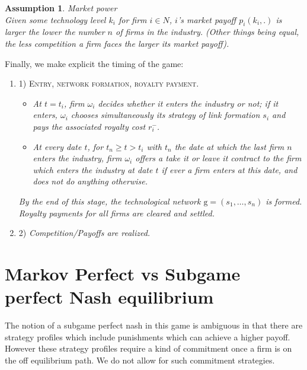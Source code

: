 \documentclass{article}
\newtheorem{assumption}{Assumption}
\begin{document}
\begin{assumption}{Market power}\label{ass3}\\
Given some technology level $k_i$ for firm $i\in N$, $i$'s market payoff $p_i(k_i,.)$ is larger the lower the number $n$ of firms in the industry. (Other things being equal, the less competition a firm faces the larger its market payoff). 
\end{assumption}

\indent Finally, we make explicit the timing of the game:       

\begin{enumerate}
    \item[] \textsc{1) Entry, network formation, royalty payment.}
\begin{itemize}
\item  \textit{At $t=t_i$, firm $\omega_i$ decides whether it enters the industry or not; if it enters, $\omega_i$ chooses simultaneously its strategy of link formation $s_i$ and pays the associated royalty cost $r^-_i$. }
\item \textit{At every date $t$, for $t_n \geq t>t_i$ with $t_n$ the date at which the last firm $n$ enters the industry, firm $\omega_i$ offers a take it or leave it contract to the firm which enters the industry at date $t$ if ever a firm enters at this date, and does not do anything otherwise. }
  \end{itemize}
\textit{By the end of this stage, the technological network $\text{g}=(s_1,\ldots,s_n)$ is formed. Royalty payments for all firms are cleared and settled.}
    \item[] \textsc{2)} \textit{Competition/Payoffs are realized.}

\end{enumerate}  

\section{Markov Perfect vs Subgame perfect Nash equilibrium}

The notion of a subgame perfect nash in this game is ambiguous in that there are strategy profiles which include punishments which can achieve a higher payoff. However these strategy profiles require a kind of commitment once a firm is on the off equilibrium path. We do not allow for such commitment strategies. 
\end{document}
